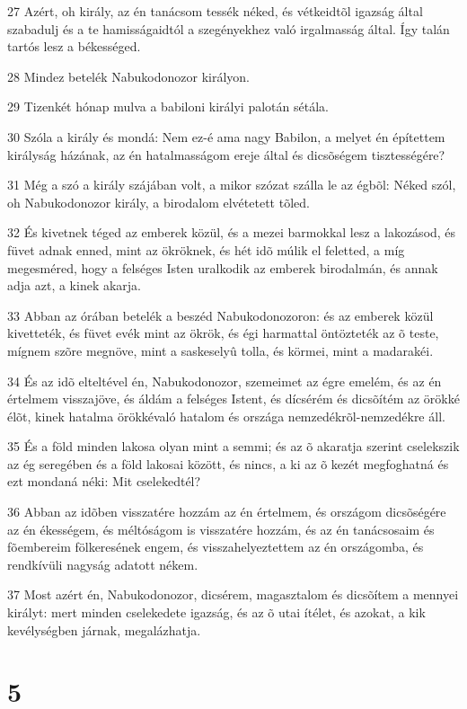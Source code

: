 \par 27 Azért, oh király, az én tanácsom tessék néked, és vétkeidtõl igazság által szabadulj és a te hamisságaidtól a szegényekhez való irgalmasság által. Így talán tartós lesz a békességed.
\par 28 Mindez betelék Nabukodonozor királyon.
\par 29 Tizenkét hónap mulva a babiloni királyi palotán sétála.
\par 30 Szóla a király és mondá: Nem ez-é ama nagy Babilon, a melyet én építettem királyság házának, az én hatalmasságom ereje által és dicsõségem tisztességére?
\par 31 Még a szó a király szájában volt, a mikor szózat szálla le az égbõl: Néked szól, oh Nabukodonozor király, a birodalom elvétetett tõled.
\par 32 És kivetnek téged az emberek közül, és a mezei barmokkal lesz a lakozásod, és füvet adnak enned, mint az ökröknek, és hét idõ múlik el feletted, a míg megesméred, hogy a felséges Isten uralkodik az emberek birodalmán, és annak adja azt, a kinek akarja.
\par 33 Abban az órában betelék a beszéd Nabukodonozoron: és az emberek közül kivetteték, és füvet evék mint az ökrök, és égi harmattal öntözteték az õ teste, mígnem szõre megnöve, mint a saskeselyû tolla, és körmei, mint a madarakéi.
\par 34 És az idõ elteltével én, Nabukodonozor, szemeimet az égre emelém, és az én értelmem visszajöve, és áldám a felséges Istent, és dícsérém és dicsõítém az örökké élõt, kinek hatalma örökkévaló hatalom és országa nemzedékrõl-nemzedékre áll.
\par 35 És a föld minden lakosa olyan mint a semmi; és az õ akaratja szerint cselekszik az ég seregében és a föld lakosai között, és nincs, a ki az õ kezét  megfoghatná és ezt mondaná néki: Mit cselekedtél?
\par 36 Abban az idõben visszatére hozzám az én értelmem, és országom dicsõségére az én ékességem, és méltóságom is visszatére hozzám, és az én tanácsosaim és fõembereim fölkeresének engem, és visszahelyeztettem az én országomba, és rendkívüli nagyság adatott nékem.
\par 37 Most azért én, Nabukodonozor, dicsérem, magasztalom és dicsõítem a mennyei királyt: mert minden cselekedete igazság, és az õ utai ítélet, és azokat, a kik  kevélységben járnak, megalázhatja.

\chapter{5}

